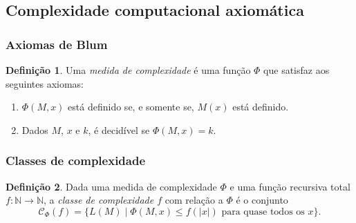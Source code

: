 \documentclass[utf8,notheorems]{beamer}
\theoremstyle{definition}
\newtheorem*{definition}{Definição}
\begin{document}
\subsection{Complexidade computacional axiomática}
\begin{frame}
    \frametitle{Axiomas de Blum}
    \begin{definition}
        Uma \emph{medida de complexidade}
        é uma função $\Phi$ que satisfaz aos seguintes axiomas:
        \begin{enumerate}
            \item
                $\Phi(M, x)$ está definido
                se, e somente se,
                $M(x)$ está definido.
            \item
                Dados $M$, $x$ e $k$,
                é decidível se $\Phi(M, x) = k$.
        \end{enumerate}
    \end{definition}
\end{frame}

\begin{frame}
    \frametitle{Classes de complexidade}
    \begin{definition}
        Dada uma medida de complexidade $\Phi$
        e uma função recursiva total
        $f: \mathbb N \rightarrow \mathbb N$,
        a \emph{classe de complexidade $f$} com relação a $\Phi$
        é o conjunto
        \begin{equation*}
            \mathcal C_\Phi(f) = \{ L(M) \mid \Phi(M, x) \leq f(|x|)
                \text{ para quase todos os $x$}
            \}.
        \end{equation*}
    \end{definition}
\end{frame}
\end{document}
